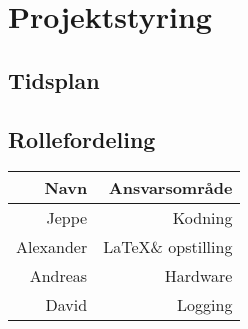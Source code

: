\section{Projektstyring}
    \begin{landscape}
        \subsection{Tidsplan}
            \begin{center}
                            
            \end{center}
    \end{landscape}
    \restoregeometry
    \subsection{Rollefordeling}
\begin{table}
            \begin{tabular}{r|r}
                \hline
                Navn       & Ansvarsområde              \\ \hline \hline
                Jeppe      & Kodning                    \\ \hline
                Alexander  & \LaTeX \space\& opstilling \\ \hline
                Andreas    & Hardware                   \\ \hline
                David      & Logging                    \\ \hline
            \end{tabular}
\end{table}